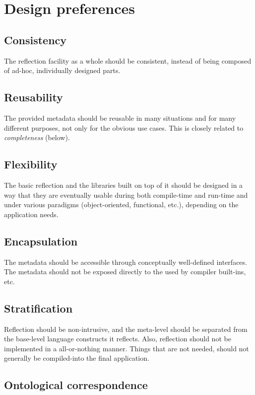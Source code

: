 \section{Design preferences}


\subsection{Consistency}

The reflection facility as a whole
should be consistent, instead of being composed of ad-hoc, individually
designed parts.

\subsection{Reusability}

The provided metadata should be reusable
in many situations and for many different purposes, not only
for the obvious use cases. This is closely related to {\em completeness} (below).

\subsection{Flexibility}

The basic reflection and the libraries
built on top of it should be designed
in a way that they are eventually usable during both compile-time
and run-time and under various paradigms (object-oriented, functional, etc.),
depending on the application needs.

\subsection{Encapsulation}

The metadata should be accessible through conceptually well-defined interfaces.
The metadata should not be exposed directly to the used by compiler built-ins, etc.

\subsection{Stratification}

Reflection should be non-intrusive,
and the meta-level should be separated from the base-level language
constructs it reflects. Also, reflection should not be implemented
in a all-or-nothing manner. Things that are not needed, should not generally
be compiled-into the final application.

\subsection{Ontological correspondence}

